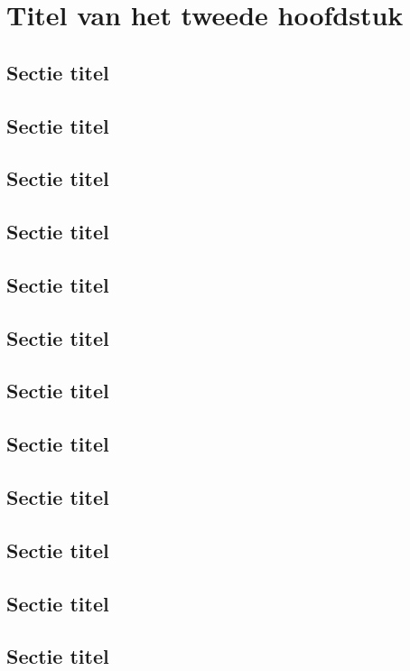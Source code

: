 \chapter{Titel van het tweede hoofdstuk}
\label{chap:rel_work}

\lipsum[2-4]

\section{Sectie titel}
\label{sec:related_work}

\lipsum[3-4]

\section{Sectie titel}
\section{Sectie titel}
\section{Sectie titel}
\section{Sectie titel}
\section{Sectie titel}
\section{Sectie titel}
\section{Sectie titel}
\section{Sectie titel}
\section{Sectie titel}
\section{Sectie titel}
\section{Sectie titel}


